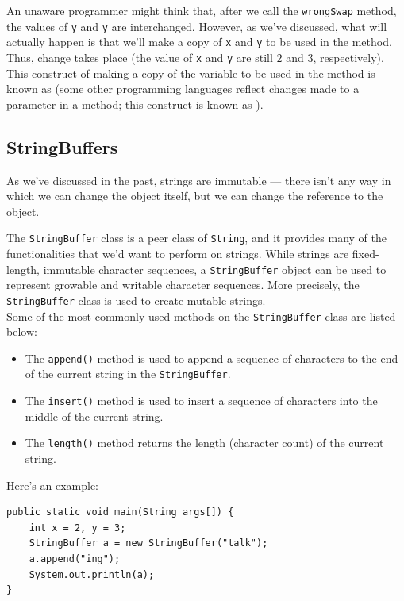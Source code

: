 An unaware programmer might think that, after we call the \verb!wrongSwap! method, the values of \verb!y! and \verb!y! are interchanged. However, as we've discussed, what will actually happen is that we'll make a copy of \verb!x! and \verb!y! to be used in the method. Thus, change takes place (the value of \verb!x! and \verb!y! are still $2$ and $3$, respectively). \\

This construct of making a copy of the variable to be used in the method is known as  (some other programming languages reflect changes made to a parameter in a method; this construct is known as ). 

\subsection{StringBuffers}

As we've discussed in the past, strings are immutable --- there isn't any way in which we can change the object itself, but we can change the reference to the object. 

The \verb!StringBuffer! class is a peer class of \verb!String!, and it provides many of the functionalities that we'd want to perform on strings. While strings are fixed-length, immutable character sequences, a \verb!StringBuffer! object can be used to represent growable and writable character sequences. More precisely, the \verb!StringBuffer! class is used to create mutable strings. \\

Some of the most commonly used methods on the \verb!StringBuffer! class are listed below:

\begin{itemize}
    \item The \verb!append()! method is used to append a sequence of characters to the end of the current string in the \verb!StringBuffer!.
    \item The \verb!insert()! method is used to insert a sequence of characters into the middle of the current string.
    \item The \verb!length()! method returns the length (character count) of the current string.
\end{itemize}

Here's an example:

\begin{lstlisting}
public static void main(String args[]) {
    int x = 2, y = 3;
    StringBuffer a = new StringBuffer("talk");
    a.append("ing");
    System.out.println(a);
}
\end{lstlisting}

